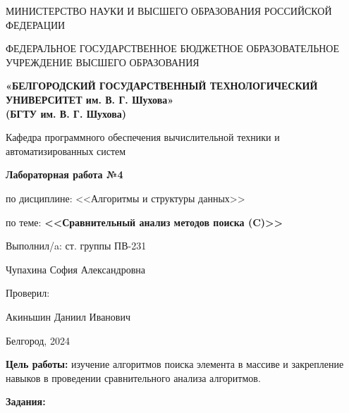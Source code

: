 \documentclass[12pt]{article}
\begin{document}
	\begin{center}
		{\parskip=1cm
			МИНИСТЕРСТВО НАУКИ И ВЫСШЕГО ОБРАЗОВАНИЯ РОССИЙСКОЙ ФЕДЕРАЦИИ
			
			ФЕДЕРАЛЬНОЕ ГОСУДАРСТВЕННОЕ БЮДЖЕТНОЕ ОБРАЗОВАТЕЛЬНОЕ УЧРЕЖДЕНИЕ ВЫСШЕГО ОБРАЗОВАНИЯ
			
			{\bf«БЕЛГОРОДСКИЙ ГОСУДАРСТВЕННЫЙ ТЕХНОЛОГИЧЕСКИЙ УНИВЕРСИТЕТ им. В. Г. Шухова»\\(БГТУ им. В. Г. Шухова)}
			
			
			\begin{figure}[bh]
			\noindent{}
			\end{figure}
			Кафедра программного обеспечения вычислительной техники и автоматизированных систем
		}
		{\parskip=0.25cm
			{\Large 
				{\bf Лабораторная работа №4}
			
				по дисциплине: <<Алгоритмы и структуры данных>>
			
				по теме: {\bf <<Сравнительный анализ методов поиска (C)>>}
			}
		}
	\end{center}
	\begin{flushright}
		{\parskip=3cm Выполнил/a: ст. группы ПВ-231}
		
		Чупахина София Александровна
		
		Проверил:
		
		Акиньшин Даниил Иванович
	\end{flushright}
	\begin{center}
		{\parskip=3cm Белгород, 2024}
	\end{center}
	\newpage
	
	{\bf Цель работы:} изучение алгоритмов поиска элемента в массиве и закрепление навыков в проведении сравнительного анализа алгоритмов.
	
	{\bf Задания:}
	
	
\end{document}
